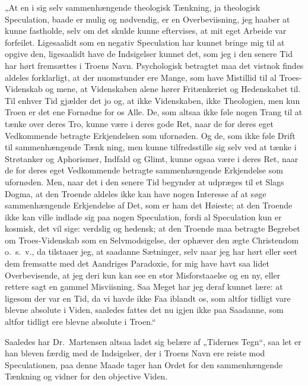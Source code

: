 „At en i sig selv sammenhængende theologisk Tænkning, ja
theologisk Speculation, baade er mulig og nødvendig, er en
Overbeviisning, jeg haaber at kunne fastholde, selv om det skulde
kunne eftervises, at mit eget Arbeide var forfeilet. Ligesaalidt
som en negativ Speculation har kunnet bringe mig til at opgive
den, ligesaalidt have de Indsigelser kunnet det, som jeg i den
senere Tid har hørt fremsættes i Troens Navn. Psychologisk
betragtet maa det vistnok findes aldeles forklarligt, at der
nuomstunder ere Mange, som have Mistillid til al Troes-Videnskab
og mene, at Videnskaben alene hører Fritænkeriet og Hedenskabet
til. Til enhver Tid gjælder det jo og, at ikke Videnskaben, ikke
Theologien, men kun Troen er det ene Fornødne for os Alle. De, som
altsaa ikke føle nogen Trang til at tænke over deres Tro, kunne
være i deres gode Ret, naar de for deres eget Vedkommende betragte
Erkjendelsen som ufornøden. Og de, som ikke føle Drift til
sammenhængende Tænk%
ning, men kunne tilfredsstille sig selv ved at tænke i Strøtanker
og Aphorismer, Indfald og Glimt, kunne ogsaa være i deres Ret,
naar de for deres eget Vedkommende betragte sammenhængende
Erkjendelse som ufornøden. Men, naar det i den senere Tid begynder
at udpræges til et Slags Dogma, at den Troende aldeles ikke kan
have nogen Interesse af at søge sammenhængende Erkjendelse af Det,
som er ham det Høieste; at den Troende ikke kan ville indlade sig
paa nogen Speculation, fordi al Speculation kun er kosmisk, det
vil sige: verdslig og hedensk; at den Troende maa betragte
Begrebet om Troes-Videnskab som en Selvmodsigelse, der ophæver den
ægte Christendom o.\ s.\ v., da tilstaaer jeg, at saadanne
Sætninger, selv naar jeg har hørt eller seet dem fremsatte med det
Aandriges Paradoxie, for mig have havt saa lidet Overbevisende, at
jeg deri kun kan see en stor Misforstaaelse og en ny, eller
rettere sagt en gammel Misviisning. Saa Meget har jeg deraf kunnet
lære: at ligesom der var en Tid, da vi havde ikke Faa iblandt os,
som altfor tidligt vare blevne absolute i Viden, saaledes fattes
det nu igjen ikke paa Saadanne, som altfor tidligt ere blevne
absolute i Troen.“

Saaledes har Dr.\ Martensen altsaa ladet sig belære af „Tidernes
Tegn“, saa let er han bleven færdig med de Indsigelser, der i
Troens Navn ere reiste mod Speculationen, paa denne Maade tager
han Ordet for den sammenhængende Tænkning og vidner for den
objective Viden.

